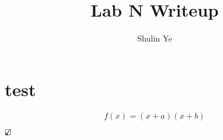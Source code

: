 \documentclass[11pt]{article} %
\title{Lab N Writeup}
\author{Shulin Ye}
\newcommand{\checked}[0]{\mbox{\mathsurround=0pt \makebox[0pt][l]{$\checkmark$}$\square$}}
\begin{document}
\maketitle
\tableofcontents

\section{test}

\begin{equation}
     f(x)=(x+a)(x+b)
 \end{equation}

$\checked$

\end{document}
